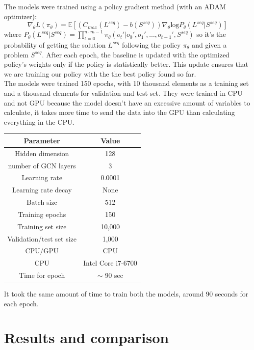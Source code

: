 \documentclass[12pt]{book}
\begin{document}
The models were trained using a policy gradient method (with an ADAM optimizer): 
\[\nabla_\theta L(\pi_\theta) = \mathbb{E}\left[(C_{max}(L^{seq})-b(S^{seq}))\nabla_\theta \mathrm{log}P_\theta(L^{seq}|S^{seq})\right]\]
where $P_\theta(L^{seq}|S^{seq})=\prod_{t=0}^{n\cdot m - 1}\pi_\theta(o_t'|o_0', o_1',...,o_{t-1}', S^{seq})$ so it's the probability of getting the solution $L^{seq}$ following the policy $\pi_\theta$ and given a problem $S^{seq}$. After each epoch, the baseline is updated with the optimized policy's weights only if the policy is statistically better. This update ensures that we are training our policy with the the best policy found so far.\\
The models were trained 150 epochs, with 10 thousand elements as a training set and a thousand elements for validation and test set. They were trained in CPU and not GPU because the model doesn't have an excessive amount of variables to calculate, it takes more time to send the data into the GPU than calculating everything in the CPU.
\begin{center}
\begin{tabular}{|c | c |} 
 \hline
 Parameter & Value \\  
 \hline
 Hidden dimension & 128 \\ 
 \hline
 number of GCN layers & 3 \\
 \hline
 Learning rate & 0.0001 \\
 \hline
 Learning rate decay & None \\
 \hline
 Batch size & 512 \\
 \hline
 Training epochs & 150 \\
 \hline
 Training set size & 10,000 \\
 \hline
 Validation/test set size & 1,000 \\
 \hline
 CPU/GPU & CPU \\
 \hline
 CPU & Intel Core i7-6700 \\
 \hline
 Time for epoch & $\sim$ 90 sec \\
 \hline
\end{tabular}
\end{center}

It took the same amount of time to train both the models, around 90 seconds for each epoch.

\chapter{Results and comparison}
\end{document}
